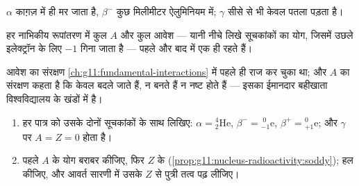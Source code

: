\begin{omfigure}

{\small $\alpha$ काग़ज़ में ही मर जाता है, $\beta^-$ कुछ मिलीमीटर ऐलुमिनियम में;
$\gamma$ सीसे से भी केवल पतला पड़ता है।}
\end{omfigure}

\begin{proposition}[नाभिकीय समीकरणों में संरक्षण]\label{prop:g11:nucleus-radioactivity:soddy}
हर नाभिकीय रूपांतरण में कुल  $A$ और कुल आवेश ---
यानी नीचे लिखे सूचकांकों का योग, जिसमें उछले इलेक्ट्रॉन के लिए $-1$ गिना
जाता है --- पहले और बाद में एक ही रहते हैं।
\end{proposition}
\admitted

\begin{remark}
आवेश का संरक्षण \cref{ch:g11:fundamental-interactions} में पहले ही राज कर चुका था; और $A$ का संरक्षण कहता
है कि  केवल बदले जाते हैं, न बनते हैं न नष्ट होते हैं ---
इसका ईमानदार बहीखाता विश्वविद्यालय के खंडों में है।
\end{remark}

\begin{method}\label{met:g11:nucleus-radioactivity:balance}
\begin{enumerate}
  \item हर पात्र को उसके दोनों सूचकांकों के साथ लिखिए: $\alpha = {}^{4}_{2}\mathrm{He}$, $\beta^- = {}^{\;0}_{-1}\mathrm{e}$,
        $\beta^+ = {}^{0}_{+1}\mathrm{e}$; और $\gamma$ पर $A = Z = 0$ होता है।
  \item पहले $A$ के योग बराबर कीजिए, फिर $Z$ के (\cref{prop:g11:nucleus-radioactivity:soddy}); हल कीजिए,
        और आवर्त सारणी में उसके $Z$ से पुत्री तत्व पढ़ लीजिए।
\end{enumerate}
\end{method}

